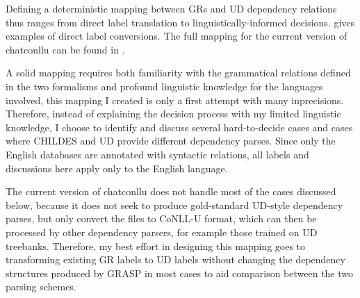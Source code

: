 Defining a deterministic mapping between GRs and UD dependency relations thus ranges from direct label translation to linguistically-informed decisions.  gives examples of direct label conversions. The full mapping for the current version of chatconllu can be found in .

 A solid mapping requires both familiarity with the grammatical relations defined in the two formalisms and profound linguistic knowledge for the languages involved, this mapping I created is only a first attempt with many inprecisions. Therefore, instead of explaining the decision process with my limited linguistic knowledge, I choose to identify and discuss several hard-to-decide cases and cases where CHILDES and UD provide different dependency parses. Since only the English databases are annotated with syntactic relations, all labels and discussions here apply only to the English language.

The current version of chatconllu does not handle most of the cases discussed below, because it does not seek to produce gold-standard UD-style dependency parses, but only convert the files to CoNLL-U format, which can then be processed by other dependency parsers, for example those trained on UD treebanks. Therefore, my best effort in designing this mapping goes to transforming existing GR labels to UD labels without changing the dependency structures produced by GRASP in most cases to aid comparison between the two parsing schemes.




